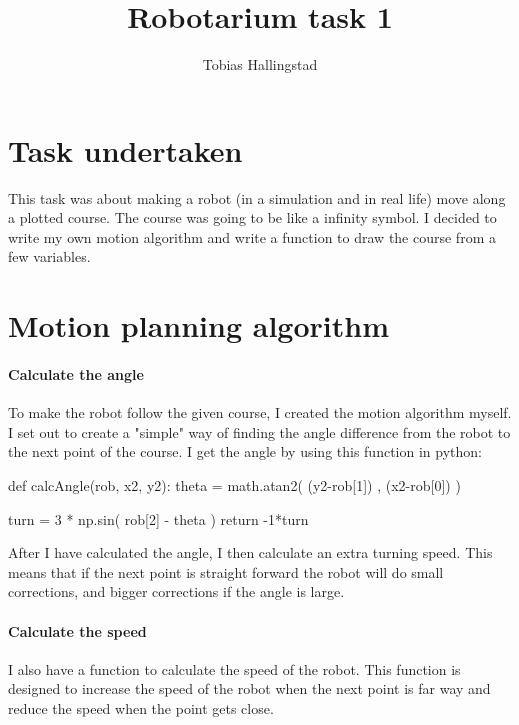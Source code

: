 \documentclass{article}
\title{Robotarium task 1}
\author{Tobias Hallingstad}
\begin{document}
    \maketitle


    \section{Task undertaken}
        This task was about making a robot (in a simulation and in real life) move along a plotted course. The course was going to be like a infinity symbol. I decided to write my own motion algorithm and write a function to draw the course from a few variables. 

    \section{Motion planning algorithm}
    
    \paragraph{Calculate the angle}
        To make the robot follow the given course, I created the motion algorithm myself. I set out to create a "simple" way of finding the angle difference from the robot to the next point of the course. I get the angle by using this function in python:

        \begin{pythoncode}
    def calcAngle(rob, x2, y2):
        theta = math.atan2( (y2-rob[1]) , (x2-rob[0]) )

        turn = 3 * np.sin( rob[2] - theta ) 
        return -1*turn
        \end{pythoncode}

        
        After I have calculated the angle, I then calculate an extra turning speed. This means that if the next point is straight forward the robot will do small corrections, and bigger corrections if the angle is large.

    \paragraph{Calculate the speed}
        I also have a function to calculate the speed of the robot. This function is designed to increase the speed of the robot when the next point is far way and reduce the speed when the point gets close.
\end{document}
